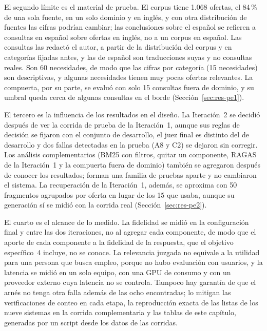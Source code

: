 El segundo límite es el material de prueba. El corpus tiene 1.068 ofertas, el 84\,\% de una sola fuente, en un solo dominio y en inglés, y con otra distribución de fuentes las cifras podrían cambiar; las conclusiones sobre el español se refieren a consultas en español sobre ofertas en inglés, no a un corpus en español. Las consultas las redactó el autor, a partir de la distribución del corpus y en categorías fijadas antes, y las de español son traducciones suyas y no consultas reales. Son 60 necesidades, de modo que las cifras por categoría (15 necesidades) son descriptivas, y algunas necesidades tienen muy pocas ofertas relevantes. La compuerta, por su parte, se evaluó con solo 15 consultas fuera de dominio, y su umbral queda cerca de algunas consultas en el borde (Sección~\ref{sec:res-pe1}).

El tercero es la influencia de los resultados en el diseño. La Iteración~2 se decidió después de ver la corrida de prueba de la Iteración~1, aunque sus reglas de decisión se fijaron con el conjunto de desarrollo, el juez final es distinto del de desarrollo y dos fallas detectadas en la prueba (A8 y C2) se dejaron sin corregir. Los análisis complementarios (BM25 con filtros, quitar un componente, RAGAS de la Iteración~1 y la compuerta fuera de dominio) también se agregaron después de conocer los resultados; forman una familia de pruebas aparte y no cambiaron el sistema. La recuperación de la Iteración~1, además, se aproxima con 50 fragmentos agrupados por oferta en lugar de los 15 que usaba, aunque su generación sí se midió con la corrida real (Sección~\ref{sec:res-pe2}).

El cuarto es el alcance de lo medido. La fidelidad se midió en la configuración final y entre las dos iteraciones, no al agregar cada componente, de modo que el aporte de cada componente a la fidelidad de la respuesta, que el objetivo específico~4 incluye, no se conoce. La relevancia juzgada no equivale a la utilidad para una persona que busca empleo, porque no hubo evaluación con usuarios, y la latencia se midió en un solo equipo, con una GPU de consumo y con un proveedor externo cuya latencia no se controla. Tampoco hay garantía de que el arnés no tenga otra falla además de las ocho encontradas; lo mitigan las verificaciones de conteo en cada etapa, la reproducción exacta de las listas de los nueve sistemas en la corrida complementaria y las tablas de este capítulo, generadas por un script desde los datos de las corridas.
